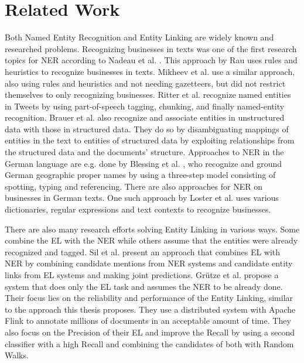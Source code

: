 \section{Related Work}
\label{sec:RelatedWork}
Both Named Entity Recognition and Entity Linking are widely known and researched problems. Recognizing businesses in texts was one of the first research topics for NER according to Nadeau et al. \cite{ner-sekine2007}. This approach by Rau \cite{rau91} uses rules and heuristics to recognize businesses in texts. Mikheev et al. \cite{Mikheev:1999:NER:977035.977037} use a similar approach, also using rules and heuristics and not needing gazetteers, but did not restrict themselves to only recognizing businesses. Ritter et al. \cite{Ritter:2011:NER:2145432.2145595} recognize named entities in Tweets by using part-of-speech tagging, chunking, and finally named-entity recognition. Brauer et al. \cite{Brauer:2008:MEE:1458550.1458566} also recognize and associate entities in unstructured data with those in structured data. They do so by disambiguating mappings of entities in the text to entities of structured data by exploiting relationships from the structured data and the documents' structure. Approaches to NER in the German language are e.g. done by Blessing et al. \cite{Blessing:2007:TCM:1316948.1316956}, who recognize and ground German geographic proper names by using a three-step model consisting of spotting, typing and referencing. There are also approaches for NER on businesses in German texts. One such approach by Loster et al. \cite{Michael2017a} uses various dictionaries, regular expressions and text contexts to recognize businesses.\par
There are also many research efforts solving Entity Linking in various ways. Some combine the EL with the NER while others assume that the entities were already recognized and tagged. Sil et al. \cite{Sil:2013:RJN:2505515.2505601} present an approach that combines EL with NER by combining candidate mentions from NER systems and candidate entity links from EL systems and making joint predictions. Grütze et al. \cite{coheel} propose a system that does only the EL task and assumes the NER to be already done. Their focus lies on the reliability and performance of the Entity Linking, similar to the approach this thesis proposes. They use a distributed system with Apache Flink to annotate millions of documents in an acceptable amount of time. They also focus on the Precision of their EL and improve the Recall by using a second classifier with a high Recall and combining the candidates of both with Random Walks.



